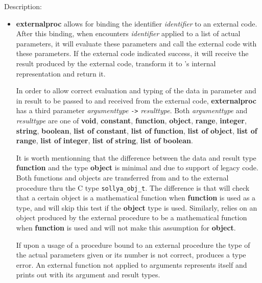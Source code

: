\noindent Description: \begin{itemize}

\item \textbf{externalproc} allows for binding the \sollya identifier \emph{identifier} to an
   external code. After this binding, when \sollya encounters \emph{identifier}
   applied to a list of actual parameters, it will evaluate these parameters and
   call the external code with these parameters. If the external code indicated
   success, it will receive the result produced by the external code, transform
   it to \sollya's internal representation and return it.
    
   In order to allow correct evaluation and typing of the data in parameter and
   in result to be passed to and received from the external code, \textbf{externalproc}
   has a third parameter \emph{argumenttype} \texttt{->} \emph{resulttype}. Both \emph{argumenttype} and
   \emph{resulttype} are one of \textbf{void}, \textbf{constant}, \textbf{function}, \textbf{object}, \textbf{range}, \textbf{integer},
   \textbf{string}, \textbf{boolean}, \textbf{list of} \textbf{constant}, \textbf{list of} \textbf{function}, \textbf{list of} \textbf{object},
   \textbf{list of} \textbf{range}, \textbf{list of} \textbf{integer}, \textbf{list of} \textbf{string}, \textbf{list of} \textbf{boolean}.
    
   It is worth mentionning that the difference between the data and
   result type \textbf{function} and the type \textbf{object} is minimal and due to
   support of legacy \sollya code. Both \sollya functions and \sollya
   objects are transferred from and to the external procedure thru the C
   type \texttt{sollya\_obj\_t}. The difference is that
   \sollya will check that a certain object is a mathematical function
   when \textbf{function} is used as a type, and will skip this test if the
   \textbf{object} type is used. Similarly, \sollya relies on an object produced
   by the external procedure to be a mathematical function when \textbf{function}
   is used and will not make this assumption for \textbf{object}.
    
   If upon a usage of a procedure bound to an external procedure the type of the
   actual parameters given or its number is not correct, \sollya produces a type
   error. An external function not applied to arguments represents itself and
   prints out with its argument and result types.
    

\end{itemize}
